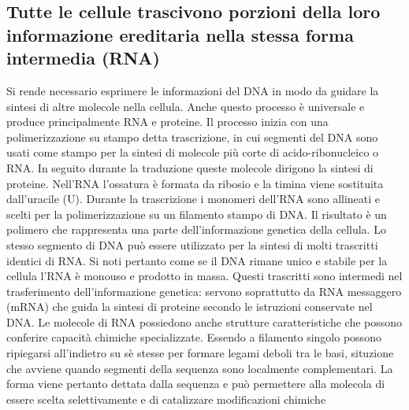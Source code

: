 \subsection{Tutte le cellule trascivono porzioni della loro informazione ereditaria nella stessa forma intermedia (RNA)}
Si rende necessario esprimere le informazioni del DNA in modo da guidare la sintesi di altre molecole nella cellula. Anche questo processo \`e universale e 
produce principalmente RNA e proteine. Il processo inizia con una polimerizzazione su stampo detta trascrizione, in cui segmenti del DNA sono usati come
stampo per la sintesi di molecole pi\`u corte di acido-ribonucleico o RNA. In seguito durante la traduzione queste molecole dirigono la sintesi di proteine.
Nell'RNA l'ossatura \`e formata da ribosio e la timina viene sostituita dall'uracile (U). Durante la trascrizione i monomeri dell'RNA sono allineati e 
scelti per la polimerizzazione su un filamento stampo di DNA. Il risultato \`e un polimero che rappresenta una parte dell'informazione genetica della 
cellula. Lo stesso segmento di DNA pu\`o essere utilizzato per la sintesi di molti trascritti identici di RNA. Si noti pertanto come se il DNA rimane unico 
e stabile per la cellula l'RNA \`e monouso e prodotto in massa. Questi trascritti sono intermedi nel trasferimento dell'informazione genetica: servono 
soprattutto da RNA messaggero (mRNA) che guida la sintesi di proteine secondo le istruzioni conservate nel DNA. Le molecole di RNA possiedono anche 
strutture caratteristiche che possono conferire capacit\`a chimiche specializzate. Essendo a filamento singolo possono ripiegarsi all'indietro su s\`e 
stesse per formare legami deboli tra le basi, situzione che avviene quando segmenti della sequenza sono localmente complementari. La forma viene pertanto 
dettata dalla sequenza e pu\`o permettere alla molecola di essere scelta selettivamente e di catalizzare modificazioni chimiche
